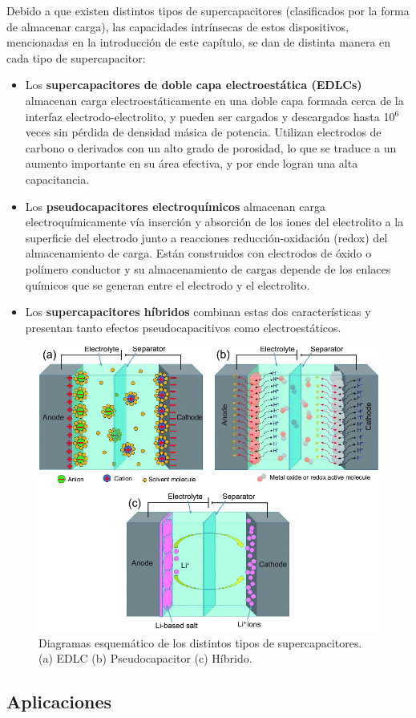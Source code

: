 Debido a que existen distintos tipos de supercapacitores (clasificados por la forma de almacenar carga), las capacidades intrínsecas de estos dispositivos, mencionadas en la introducción de este capítulo, se dan de distinta manera en cada tipo de supercapacitor:

\begin{itemize}
    \item Los \textbf{supercapacitores de doble capa electroestática (EDLCs)} almacenan carga electroestáticamente en una doble capa formada cerca de la interfaz electrodo-electrolito, y pueden ser cargados y descargados hasta 10$^6$ veces sin pérdida de densidad másica de potencia. Utilizan electrodos de carbono o derivados con un alto grado de porosidad, lo que se traduce a un aumento importante en su área efectiva, y por ende logran una alta capacitancia.
    \item Los \textbf{pseudocapacitores electroquímicos} almacenan carga electroquímicamente vía inserción y absorción de los iones del electrolito a la superficie del electrodo junto a reacciones reducción-oxidación (redox) del almacenamiento de carga. Están construidos con electrodos de óxido o polímero conductor y su almacenamiento de cargas depende de los enlaces químicos que se generan entre el electrodo y el electrolito.
    \item Los \textbf{supercapacitores híbridos} combinan estas dos características y presentan tanto efectos pseudocapacitivos como electroestáticos.
\end{itemize}

\begin{figure}[hbt!]
  \centering
  \includegraphics[width=0.50\columnwidth]{Imágenes/Diagrama esquemático de supercapacitores.png}
  \caption{Diagramas esquemático de los distintos tipos de supercapacitores. (a) EDLC (b) Pseudocapacitor (c) Híbrido.}
  \label{ragone}
\end{figure} 


\subsection{Aplicaciones}

